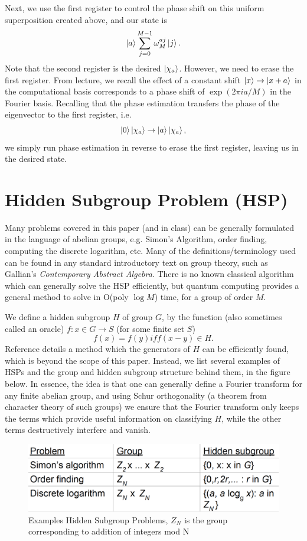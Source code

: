 \documentclass[11pt]{journal}
\begin{document}
Next, we use the first register to control the phase shift on this uniform superposition created above, and our state is 
\[\ket{a} \sum_{j=0}^{M-1} \omega_M^{aj} \ket{j}.\]
Note that the second register is the desired $\ket{\chi_a}$. However, we need to erase the first register. From lecture, we recall the effect of a constant shift $\ket{x} \rightarrow \ket{x + a}$ in the computational basis corresponds to a phase shift of $\exp(2 \pi i a/ M)$ in the Fourier basis. Recalling that the phase estimation transfers the phase of the eigenvector to the first register, i.e. 
\[\ket{0} \ket{\chi_a} \rightarrow \ket{a} \ket{\chi_a},\]
we simply run phase estimation in reverse to erase the first register, leaving us in the desired state. 

\section{Hidden Subgroup Problem (HSP)}
Many problems covered in this paper (and in class) can be generally formulated in the language of abelian groups, e.g. Simon's Algorithm, order finding, computing the discrete logarithm, etc. Many of the definitions/terminology used can be found in any standard introductory text on group theory, such as Gallian's \textit{Contemporary Abstract Algebra}. There is no known classical algorithm which can generally solve the HSP efficiently, but quantum computing provides a general method to solve in O(poly $\log M$) time, for a group of order $M$\cite{mp}.

We define a hidden subgroup $H$ of group $G$, by the function (also sometimes called an oracle) $f: x \in G \rightarrow S$ (for some finite set $S$)
\[f(x) = f(y) iff (x-y) \in H.\]
Reference \cite{mp} details a method which the generators of $H$ can be efficiently found, which is beyond the scope of this paper. Instead, we list several examples of HSPs and the group and hidden subgroup structure behind them, in the figure below. In essence, the idea is that one can generally define a Fourier transform for any finite abelian group, and using Schur orthogonality (a theorem from character theory of such groups) we ensure that the Fourier transform only keeps the terms which provide useful information on classifying $H$, while the other terms destructively interfere and vanish.\\
\begin{figure}
    \centering
    \includegraphics[scale = 0.3]{6.png}
    \caption{Examples Hidden Subgroup Problems, $Z_N$ is the group corresponding to addition of integers mod N}
\end{figure}
\end{document}

